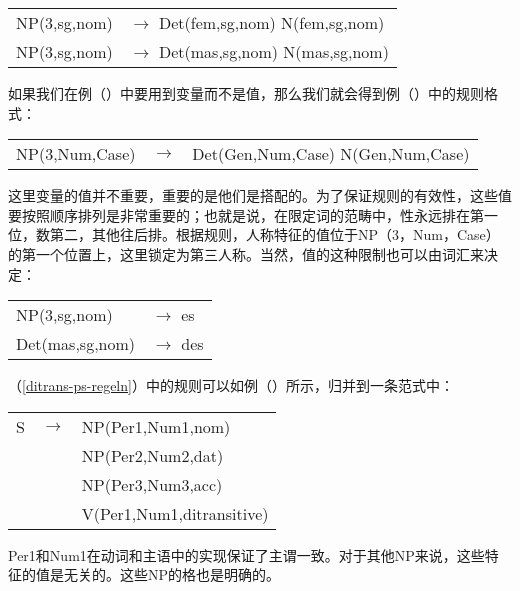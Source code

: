 \ea
\begin{tabular}[t]{@{}l@{ }l}
NP(3,sg,nom)  & $\to$ Det(fem,sg,nom) N(fem,sg,nom)\\
NP(3,sg,nom)  & $\to$ Det(mas,sg,nom) N(mas,sg,nom)\\
\end{tabular}
\z
如果我们在例（）中要用到变量而不是值，那么我们就会得到例（）中的规则格式：
\ea
\label{Regel-mit-Variablen}
\begin{tabular}[t]{@{}l@{ }l@{ }l}
NP({3},{Num},{Case}) & $\to$ & Det(Gen,{Num},{Case}) N(Gen,{Num},{Case})\\
\end{tabular}
\z
这里变量的值并不重要，重要的是他们是搭配的。为了保证规则的有效性，这些值要按照顺序排列是非常重要的；也就是说，在限定词的范畴中，性永远排在第一位，数第二，其他往后排。根据规则，人称特征的值位于NP（3，Num，Case）的第一个位置上，这里锁定为第三人称。当然，值的这种限制也可以由词汇来决定：
\ea
\begin{tabular}[t]{@{}l@{ }l}
NP(3,sg,nom)  & $\to$ es\\
Det(mas,sg,nom)  & $\to$ des\\
\end{tabular}
\z

\noindent
（\ref{ditrans-ps-regeln}）中的规则可以如例（）所示，归并到一条范式中：
\ea
\label{ditrans-schema}
\begin{tabular}[t]{@{}l@{ }l@{ }l}
S  & $\to$ & NP({Per1},{Num1},{nom}) \\
   &       & NP(Per2,Num2,{dat})\\
   &       & NP(Per3,Num3,{acc})\\
   &       & V({Per1},{Num1},ditransitive)\\
\end{tabular}
\z
Per1和Num1在动词和主语中的实现保证了主谓一致。对于其他NP来说，这些特征的值是无关的。这些NP的格也是明确的。

